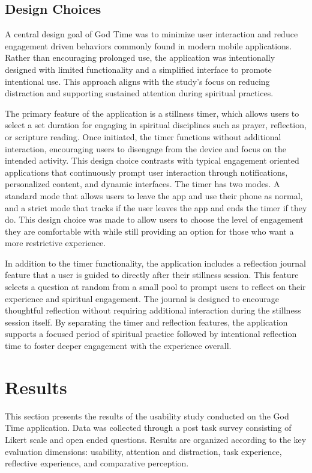 \documentclass[12pt]{article}
\begin{document}
\subsection{Design Choices}

A central design goal of God Time was to minimize user interaction and reduce engagement driven behaviors commonly found in modern mobile applications. Rather than encouraging prolonged use, the application was intentionally designed with limited functionality and a simplified interface to promote intentional use. This approach aligns with the study's focus on reducing distraction and supporting sustained attention during spiritual practices. 

The primary feature of the application is a stillness timer, which allows users to select a set duration for engaging in spiritual disciplines such as prayer, reflection, or scripture reading. Once initiated, the timer functions without additional interaction, encouraging users to disengage from the device and focus on the intended activity. This design choice contrasts with typical engagement oriented applications that continuously prompt user interaction through notifications, personalized content, and dynamic interfaces. The timer has two modes. A standard mode that allows users to leave the app and use their phone as normal, and a strict mode that tracks if the user leaves the app and ends the timer if they do. This design choice was made to allow users to choose the level of engagement they are comfortable with while still providing an option for those who want a more restrictive experience.

In addition to the timer functionality, the application includes a reflection journal feature that a user is guided to directly after their stillness session. This feature selects a question at random from a small pool to prompt users to reflect on their experience and spiritual engagement. The journal is designed to encourage thoughtful reflection without requiring additional interaction during the stillness session itself. By separating the timer and reflection features, the application supports a focused period of spiritual practice followed by intentional reflection time to foster deeper engagement with the experience overall.
\section{Results}

This section presents the results of the usability study conducted on the God Time application. Data was collected through a post task survey consisting of Likert scale and open ended questions. Results are organized according to the key evaluation dimensions: usability, attention and distraction, task experience, reflective experience, and comparative perception. 
\end{document}
